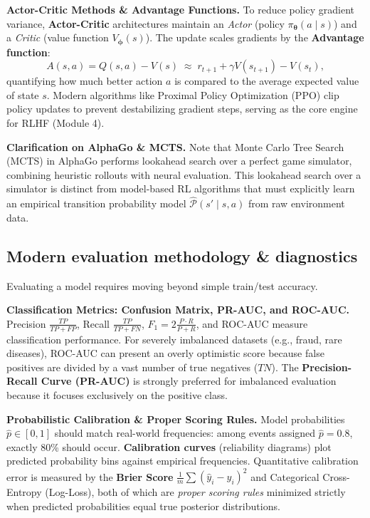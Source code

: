 \documentclass[11pt,a4paper]{article}
\begin{document}
	\textbf{Actor-Critic Methods \& Advantage Functions.} To reduce policy gradient variance, \textbf{Actor-Critic} architectures maintain an \emph{Actor} (policy $\pi_{\boldsymbol{\theta}}(a \mid s)$) and a \emph{Critic} (value function $V_{\boldsymbol{\phi}}(s)$). The update scales gradients by the \textbf{Advantage function}:
	\begin{equation}
		A(s, a) = Q(s, a) - V(s) \;\approx\; r_{t+1} + \gamma V(s_{t+1}) - V(s_t),
	\end{equation}
	quantifying how much better action $a$ is compared to the average expected value of state $s$. Modern algorithms like Proximal Policy Optimization (PPO) \parencite{schulman2017} clip policy updates to prevent destabilizing gradient steps, serving as the core engine for RLHF (Module 4).
	
	\textbf{Clarification on AlphaGo \& MCTS.} Note that Monte Carlo Tree Search (MCTS) in AlphaGo \parencite{silver2016} performs lookahead search over a perfect game simulator, combining heuristic rollouts with neural evaluation. This lookahead search over a simulator is distinct from model-based RL algorithms that must explicitly learn an empirical transition probability model $\hat{\mathcal{P}}(s' \mid s, a)$ from raw environment data.

	\subsection{Modern evaluation methodology \& diagnostics}
	
	Evaluating a model requires moving beyond simple train/test accuracy.
	
	\textbf{Classification Metrics: Confusion Matrix, PR-AUC, and ROC-AUC.} Precision $\frac{TP}{TP+FP}$, Recall $\frac{TP}{TP+FN}$, $F_1 = 2 \frac{P \cdot R}{P + R}$, and ROC-AUC measure classification performance. For severely imbalanced datasets (e.g., fraud, rare diseases), ROC-AUC can present an overly optimistic score because false positives are divided by a vast number of true negatives ($TN$). The \textbf{Precision-Recall Curve (PR-AUC)} is strongly preferred for imbalanced evaluation because it focuses exclusively on the positive class.
	
	\textbf{Probabilistic Calibration \& Proper Scoring Rules.} Model probabilities $\hat{p} \in [0, 1]$ should match real-world frequencies: among events assigned $\hat{p} = 0.8$, exactly 80\% should occur. \textbf{Calibration curves} (reliability diagrams) plot predicted probability bins against empirical frequencies. Quantitative calibration error is measured by the \textbf{Brier Score} $\frac{1}{m}\sum (\hat{y}_i - y_i)^2$ and Categorical Cross-Entropy (Log-Loss), both of which are \emph{proper scoring rules} minimized strictly when predicted probabilities equal true posterior distributions.
	
\end{document}
